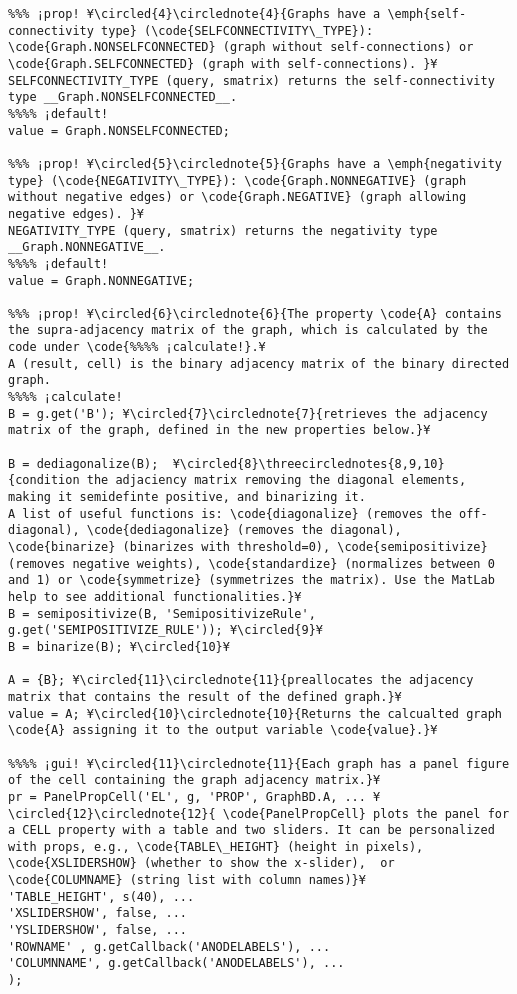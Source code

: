 \documentclass{tufte-handout}
\begin{document}
\begin{lstlisting}
%%% ¡prop! ¥\circled{4}\circlednote{4}{Graphs have a \emph{self-connectivity type} (\code{SELFCONNECTIVITY\_TYPE}): \code{Graph.NONSELFCONNECTED} (graph without self-connections) or \code{Graph.SELFCONNECTED} (graph with self-connections). }¥
SELFCONNECTIVITY_TYPE (query, smatrix) returns the self-connectivity type __Graph.NONSELFCONNECTED__.
%%%% ¡default!
value = Graph.NONSELFCONNECTED;

%%% ¡prop! ¥\circled{5}\circlednote{5}{Graphs have a \emph{negativity type} (\code{NEGATIVITY\_TYPE}): \code{Graph.NONNEGATIVE} (graph without negative edges) or \code{Graph.NEGATIVE} (graph allowing negative edges). }¥
NEGATIVITY_TYPE (query, smatrix) returns the negativity type __Graph.NONNEGATIVE__.
%%%% ¡default!
value = Graph.NONNEGATIVE;

%%% ¡prop! ¥\circled{6}\circlednote{6}{The property \code{A} contains the supra-adjacency matrix of the graph, which is calculated by the code under \code{%%%% ¡calculate!}.¥
A (result, cell) is the binary adjacency matrix of the binary directed graph.
%%%% ¡calculate!
B = g.get('B'); ¥\circled{7}\circlednote{7}{retrieves the adjacency matrix of the graph, defined in the new properties below.}¥

B = dediagonalize(B);  ¥\circled{8}\threecirclednotes{8,9,10}{condition the adjaciency matrix removing the diagonal elements, making it semidefinte positive, and binarizing it.
A list of useful functions is: \code{diagonalize} (removes the off-diagonal), \code{dediagonalize} (removes the diagonal), \code{binarize} (binarizes with threshold=0), \code{semipositivize} (removes negative weights), \code{standardize} (normalizes between 0 and 1) or \code{symmetrize} (symmetrizes the matrix). Use the MatLab help to see additional functionalities.}¥
B = semipositivize(B, 'SemipositivizeRule', g.get('SEMIPOSITIVIZE_RULE')); ¥\circled{9}¥
B = binarize(B); ¥\circled{10}¥

A = {B}; ¥\circled{11}\circlednote{11}{preallocates the adjacency matrix that contains the result of the defined graph.}¥
value = A; ¥\circled{10}\circlednote{10}{Returns the calcualted graph \code{A} assigning it to the output variable \code{value}.}¥

%%%% ¡gui! ¥\circled{11}\circlednote{11}{Each graph has a panel figure of the cell containing the graph adjacency matrix.}¥
pr = PanelPropCell('EL', g, 'PROP', GraphBD.A, ... ¥\circled{12}\circlednote{12}{ \code{PanelPropCell} plots the panel for a CELL property with a table and two sliders. It can be personalized with props, e.g., \code{TABLE\_HEIGHT} (height in pixels), \code{XSLIDERSHOW} (whether to show the x-slider),  or \code{COLUMNAME} (string list with column names)}¥
'TABLE_HEIGHT', s(40), ... 
'XSLIDERSHOW', false, ... 
'YSLIDERSHOW', false, ...  
'ROWNAME' , g.getCallback('ANODELABELS'), ... 
'COLUMNNAME', g.getCallback('ANODELABELS'), ...
);








\end{lstlisting}
\end{document}
